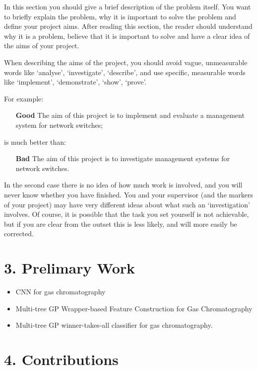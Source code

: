 \documentclass[11pt, a4paper, twoside, openright]{report}
\begin{document}
In this section you should give a brief description of the problem
itself. You want to briefly explain the problem, why it is important
to solve the problem and define your project aims. After reading this
section, the reader should understand why it is a problem, believe
that it is important to solve and have a clear idea of the aims of
your project.

When describing the aims of the project, you should avoid vague,
unmeasurable words like `analyse', `investigate', `describe', and use
specific, measurable words like `implement', `demonstrate', `show',
`prove'.

For example:

\begin{itemize}
\item[\bf Good] The aim of this project is to implement and evaluate a
  management system for network switches;
\end{itemize}
is much better than:
\begin{itemize}
\item[\bf Bad] The aim of this project is to investigate management
  systems for network switches.
\end{itemize}

In the second case there is no idea of how much work is involved, and
you will never know whether you have finished. You and your supervisor
(and the markers of your project) may have very different ideas about
what such an `investigation' involves. Of course, it is possible that
the task you set yourself is not achievable, but if you are clear from
the outset this is less likely, and will more easily be corrected.

\section*{3. Prelimary Work}

\begin{itemize}
  \item CNN for gas chromatography 
  \item Multi-tree GP Wrapper-based Feature Construction for Gas Chromatography 
  \item Multi-tree GP winner-takes-all classifier for gas chromatography. 
\end{itemize}

\section*{4. Contributions}
\end{document}
